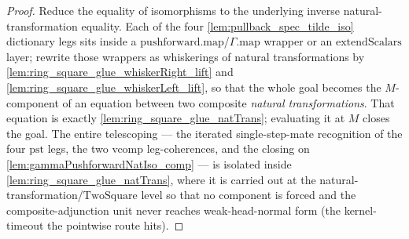 \begin{lemma}
\begin{proof}
    Reduce the equality of isomorphisms to the underlying inverse natural-transformation equality. Each
    of the four \cref{lem:pullback_spec_tilde_iso} dictionary legs sits inside a
    \(\mathrm{pushforward}.\mathrm{map}\)/\(\Gamma.\mathrm{map}\) wrapper or an
    \(\mathrm{extendScalars}\) layer; rewrite those wrappers as whiskerings of natural transformations
    by \cref{lem:ring_square_glue_whiskerRight_lift} and \cref{lem:ring_square_glue_whiskerLeft_lift},
    so that the whole goal becomes the \(M\)-component of an equation between two composite \emph{natural
    transformations}. That equation is exactly \cref{lem:ring_square_glue_natTrans}; evaluating it at
    \(M\) closes the goal. The entire telescoping --- the iterated single-step-mate recognition of the
    four \(\mathrm{pst}\) legs, the two vcomp leg-coherences, and the closing on
    \cref{lem:gammaPushforwardNatIso_comp} --- is isolated inside
    \cref{lem:ring_square_glue_natTrans}, where it is carried out at the
    natural-transformation/\(\mathrm{TwoSquare}\) level so that no component is forced and the
    composite-adjunction unit never reaches weak-head-normal form (the kernel-timeout the pointwise
    route hits).
  \end{proof}
\end{lemma}

